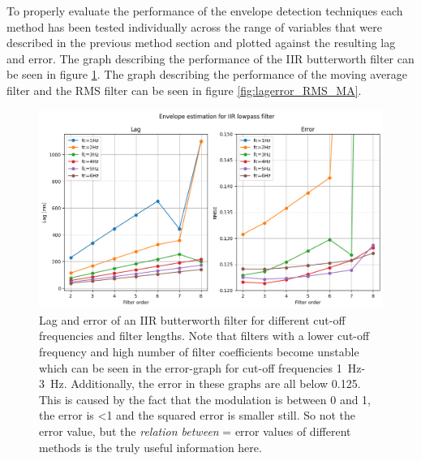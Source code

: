 To properly evaluate the performance of the envelope detection techniques each method has been tested individually across the range of variables that were described in the previous method section and plotted against the resulting lag and error. The graph describing the performance of the IIR butterworth filter can be seen in figure \ref{fig:lagerror_iir}. The graph describing the performance of the moving average filter and the RMS filter can be seen in figure \ref{fig:lagerror_RMS_MA}.

\begin{figure}[h!t]
	\begin{center}
		\includegraphics[width=1.0\columnwidth]{images/lagerror_iirfilter.png}
	\end{center}
	\caption{Lag and error of an IIR butterworth filter for different cut-off frequencies and filter lengths. Note that filters with a lower cut-off frequency and high number of filter coefficients become unstable which can be seen in the error-graph for cut-off frequencies \SI{1}{\hertz}-\SI{3}{\hertz}. Additionally, the error in these graphs are all below 0.125. This is caused by the fact that the modulation is between 0 and 1, the error is <1 and the squared error is smaller still. So not the error value, but the \textit{relation between} = error values of different methods is the truly useful information here.}
	\label{fig:lagerror_iir}
\end{figure}

